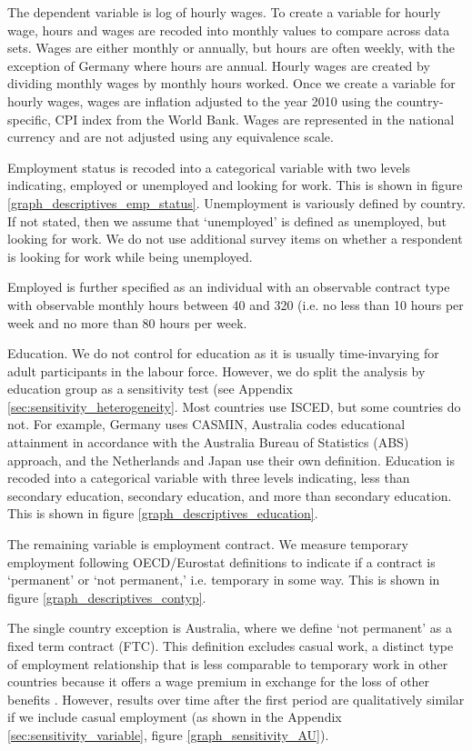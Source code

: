 The dependent variable is log of hourly wages.  To create a variable for hourly wage, hours and wages are recoded into monthly values to compare across data sets.  Wages are either monthly or annually, but hours are often weekly, with the exception of Germany where hours are annual.  Hourly wages are created by dividing monthly wages by monthly hours worked.    Once we create a variable for hourly wages, wages are inflation adjusted to the year 2010 using the country-specific, CPI index from the World Bank.  Wages are represented in the national currency and are not adjusted using any equivalence scale.  

Employment status is recoded into a categorical variable with two levels indicating, employed or unemployed and looking for work.  This is shown in figure \ref{graph_descriptives_emp_status}.  Unemployment is variously defined by country.  If not stated, then we assume that `unemployed' is defined as unemployed, but looking for work.  We do not use additional survey items on whether a respondent is looking for work while being unemployed.  

Employed is further specified as an individual with an observable contract type with observable monthly hours between 40 and 320 (i.e. no less than 10 hours per week and no more than 80 hours per week.


Education.  We do not control for education as it is usually time-invarying for adult participants in the labour force.  However, we do split the analysis by education group as a sensitivity test (see Appendix \ref{sec:sensitivity_heterogeneity}.  Most countries use ISCED, but some countries do not.  For example, Germany uses CASMIN, Australia codes educational attainment in accordance with the Australia Bureau of Statistics (ABS) approach, and the Netherlands and Japan use their own definition.  Education is recoded into a categorical variable with three levels indicating, less than secondary education, secondary education, and more than secondary education.  This is shown in figure \ref{graph_descriptives_education}.

The remaining variable is employment contract.  We measure temporary employment following OECD/Eurostat definitions to indicate if a contract is `permanent' or  `not permanent,' i.e. temporary in some way.  This is shown in figure \ref{graph_descriptives_contyp}.  

The single country exception is Australia, where we define `not permanent' as a fixed term contract (FTC).  This definition excludes casual work, a distinct type of employment relationship that is less comparable to temporary work in other countries because it offers a wage premium in exchange for the loss of other benefits \citep{mooi-reci_casual_2017}.  However, results over time after the first period are qualitatively similar if we include casual employment (as shown in the Appendix \ref{sec:sensitivity_variable}, figure \ref{graph_sensitivity_AU}).  

